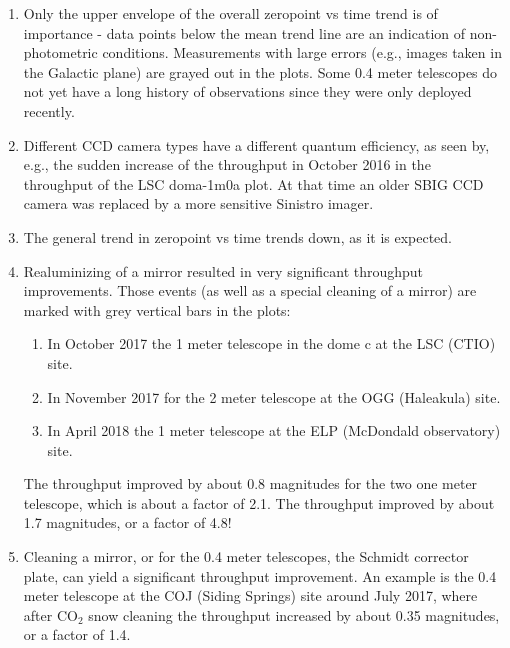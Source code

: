 \documentclass[]{spieman}
\begin{document}
\begin{enumerate}

\item Only the upper envelope of the overall zeropoint vs time trend is of importance - data points
below the mean trend line are an indication of non-photometric conditions. Measurements with large
errors (e.g., images taken in the Galactic plane) are grayed out in the plots. Some 0.4 meter 
telescopes do not yet have a long history of observations since they were only deployed recently.

\item Different CCD camera types have a different quantum efficiency, as seen by, e.g., the sudden
increase of the throughput in October 2016 in the throughput of the LSC doma-1m0a plot. At that time
an older SBIG CCD camera was replaced by a more sensitive Sinistro imager.

\item The general trend in zeropoint vs time trends down, as it is expected.

\item Realuminizing of a mirror resulted in very significant throughput improvements. Those events 
(as well as a special cleaning of a mirror) are marked with grey vertical bars in the plots:
 \begin{enumerate}
 	\item In October 2017 the 1 meter telescope in the dome c at the LSC (CTIO) site.
    \item In November 2017 for the 2 meter telescope at the OGG (Haleakula) site. 
    \item In April 2018 the 1 meter telescope at the ELP  (McDondald observatory) site.
\end{enumerate}
 The throughput improved by about 0.8 magnitudes for the two one meter telescope, which is about a 
 factor of 2.1. The throughput improved by about 1.7 magnitudes, or a factor of 4.8!

\item Cleaning a mirror, or for the 0.4 meter telescopes, the Schmidt corrector plate, can yield
a significant throughput improvement. An example is the 0.4 meter telescope at the COJ (Siding 
Springs) site around July 2017, where after CO$_2$ snow cleaning the throughput increased by about 
0.35 magnitudes, or a factor of 1.4. 


\end{enumerate}
\end{document}
